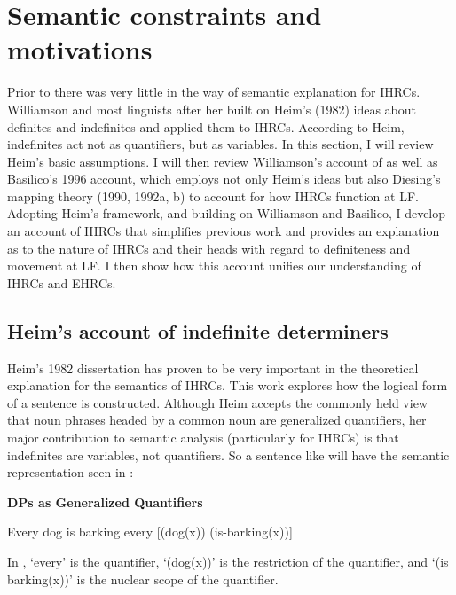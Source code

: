 \documentclass[output=paper]{LSP/langsci}
\begin{document}
\section{Semantic constraints and motivations} 

Prior to \citet{Williamson1987} there was very little in the way of semantic explanation for IHRCs. Williamson and most linguists after her built on Heim's (1982) ideas about definites and indefinites and applied them to IHRCs. According to Heim, indefinites act not as quantifiers, but as variables.  In this section, I will review Heim's basic assumptions. I will then review Williamson's account of \citet{IHRC1987} as well as Basilico's 1996 account, which employs not only Heim's ideas but also Diesing's mapping theory (1990, 1992a, b) to account for how IHRCs function at LF. Adopting Heim's framework, and building on Williamson and Basilico, I develop an account of IHRCs that simplifies previous work and provides an explanation as to the nature of IHRCs and their heads with regard to definiteness and movement at LF. I then show how this account unifies our understanding of IHRCs and EHRCs.

\subsection{Heim's account of indefinite determiners} 

Heim's 1982 dissertation has proven to be very important in the theoretical explanation for the semantics of IHRCs. This work explores how the logical form of a sentence is constructed. Although Heim accepts the commonly held view that noun phrases headed by a common noun are generalized quantifiers, her major contribution to semantic analysis (particularly for IHRCs) is that indefinites are variables, not quantifiers.  So a sentence like  will have the semantic representation seen in :

\ea \textbf{DPs as Generalized Quantifiers}
\begin{xlist}
\ex Every dog is barking \label{boyle39a}
\ex every [(dog(x)) (is-barking(x))] \label{boyle39b}
\end{xlist}
\z

In , `every' is the quantifier, `(dog(x))' is the restriction of the quantifier, and `(is barking(x))' is the nuclear scope of the quantifier.  
\end{document}
